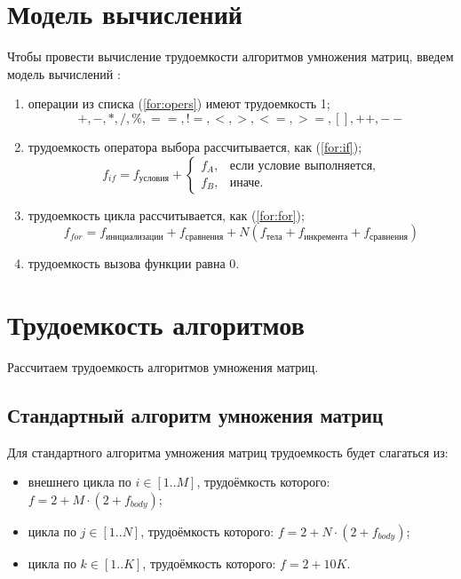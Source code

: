 \clearpage


\section{Модель вычислений}

Чтобы провести вычисление трудоемкости алгоритмов умножения матриц, введем модель вычислений \cite{model}:

\begin{enumerate}
	\item операции из списка (\ref{for:opers}) имеют трудоемкость 1;
	\begin{equation}
		\label{for:opers}
		+, -, *, /, \%, ==, !=, <, >, <=, >=, [], ++, {-}-
	\end{equation}
	\item трудоемкость оператора выбора  рассчитывается, как (\ref{for:if});
	\begin{equation}
		\label{for:if}
		f_{if} = f_{\text{условия}} +
		\begin{cases}
			f_A, & \text{если условие выполняется,}\\
			f_B, & \text{иначе.}
		\end{cases}
	\end{equation}
	\item трудоемкость цикла рассчитывается, как (\ref{for:for});
	\begin{equation}
		\label{for:for}
		f_{for} = f_{\text{инициализации}} + f_{\text{сравнения}} + N(f_{\text{тела}} + f_{\text{инкремента}} + f_{\text{сравнения}})
	\end{equation}
	\item трудоемкость вызова функции равна 0.
\end{enumerate}


\section{Трудоемкость алгоритмов}

Рассчитаем трудоемкость алгоритмов умножения матриц.

\subsection{Стандартный алгоритм умножения матриц}

Для стандартного алгоритма умножения матриц трудоемкость будет слагаться из:

\begin{itemize}
	\item внешнего цикла по $i \in [1..M]$, трудоёмкость которого: $f = 2 + M \cdot (2 + f_{body})$;
	\item цикла по $j \in [1..N]$, трудоёмкость которого: $f = 2 + N \cdot (2 + f_{body})$;
	\item цикла по $k \in [1..K]$, трудоёмкость которого: $f = 2 + 10K$. \newline
\end{itemize}

